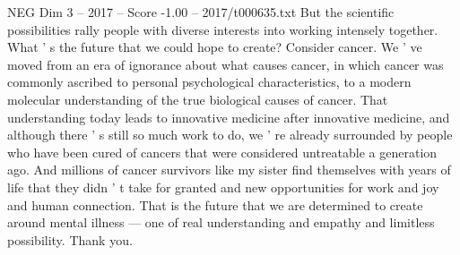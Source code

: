 \begin{textsample}{NEG Dim 3 – 2017 – Score -1.00 – 2017/t000635.txt}
But the scientific possibilities rally people with diverse interests into working intensely together.
What ' s the future that we could hope to create?
Consider cancer.
We ' ve moved from an era of ignorance about what causes cancer, in which cancer was commonly ascribed to personal psychological characteristics, to a modern molecular understanding of the true biological causes of cancer.
That understanding today leads to innovative medicine after innovative medicine, and although there ' s still so much work to do, we ' re already surrounded by people who have been cured of cancers that were considered untreatable a generation ago.
And millions of cancer survivors like my sister find themselves with years of life that they didn ' t take for granted and new opportunities for work and joy and human connection.
That is the future that we are determined to create around mental illness — one of real understanding and empathy and limitless possibility.
Thank you.

\end{textsample}
